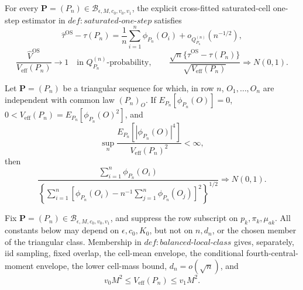 For every \(\mathbf P=(P_n)\in
\mathcal B_{\epsilon,M,c_0,v_0,v_1}\), the explicit cross-fitted saturated-cell
one-step estimator in \(def:saturated\text{-}one\text{-}step\) satisfies
\[
 \widehat\tau^{\mathrm{OS}}-\tau(P_n)
 =\frac1n\sum_{i=1}^n\phi_{P_n}(O_i)
   +o_{Q_{P_n}^{(n)}}(n^{-1/2}),
\]
\[
 \frac{\widehat V^{\mathrm{OS}}}{V_{\mathrm{eff}}(P_n)}
 \longrightarrow1
 \quad\text{in }Q_{P_n}^{(n)}\text{-probability},
 \qquad
 \frac{\sqrt n\{\widehat\tau^{\mathrm{OS}}-\tau(P_n)\}}
      {\sqrt{V_{\mathrm{eff}}(P_n)}}
 \Rightarrow N(0,1).
\]

Let \(\mathbf P=(P_n)\) be a triangular sequence for which, in row \(n\),
\(O_1,\ldots,O_n\) are independent with common law \((P_n)_O\).  If
\(E_{P_n}[\phi_{P_n}(O)]=0\),
\(0<V_{\mathrm{eff}}(P_n)=E_{P_n}[\phi_{P_n}(O)^2]\), and
\[
 \sup_n\frac{E_{P_n}[|\phi_{P_n}(O)|^4]}
                 {V_{\mathrm{eff}}(P_n)^2}<\infty,
\]
then
\[
 \frac{\sum_{i=1}^n\phi_{P_n}(O_i)}
 {\left\{\sum_{i=1}^n
 [\phi_{P_n}(O_i)-n^{-1}\sum_{j=1}^n\phi_{P_n}(O_j)]^2\right\}^{1/2}}
 \Rightarrow N(0,1).
\]

Fix \(\mathbf P=(P_n)\in
\mathcal B_{\epsilon,M,c_0,v_0,v_1}\), and suppress the row subscript on
\(p_k,\pi_k,\mu_{ak}\).  All constants below may depend on
\(\epsilon,c_0,K_0\), but not on \(n,d_n\), or the chosen member of the
triangular class.  Membership in \(def:balanced\text{-}local\text{-}class\)
gives, separately, iid sampling, fixed overlap, the cell-mean envelope, the
conditional fourth-central-moment envelope, the lower cell-mass bound,
\(d_n=o(\sqrt n)\), and
\[
 v_0M^2\le V_{\mathrm{eff}}(P_n)\le v_1M^2.
\tag{1}
\]

